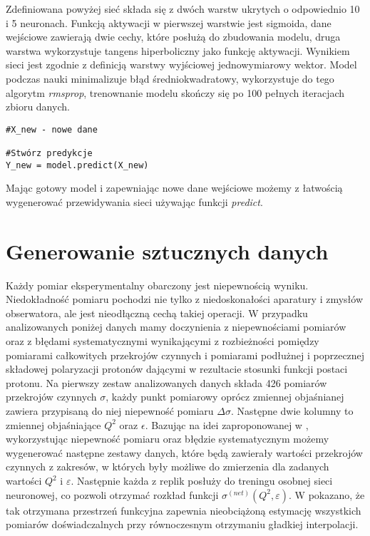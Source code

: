 \documentclass[11pt]{book}
\theoremstyle{definition}
\begin{document}
Zdefiniowana powyżej sieć składa się z dwóch warstw ukrytych o odpowiednio 10 i 5 neuronach. Funkcją aktywacji w pierwszej warstwie jest sigmoida, dane wejściowe zawierają dwie cechy, które posłużą do zbudowania modelu, druga warstwa wykorzystuje tangens hiperboliczny jako funkcję aktywacji. Wynikiem sieci jest zgodnie z definicją warstwy wyjściowej jednowymiarowy wektor. Model podczas nauki minimalizuje błąd średniokwadratowy, wykorzystuje do tego algorytm \textit{rmsprop}, trenownanie modelu skończy się po 100 pełnych iteracjach zbioru danych.

\begin{lstlisting}
#X_new - nowe dane 

#Stwórz predykcje
Y_new = model.predict(X_new)
\end{lstlisting}

Mając gotowy model i zapewniając nowe dane wejściowe możemy z łatwością wygenerować przewidywania sieci używając funkcji \textit{predict}.

\section{Generowanie sztucznych danych}


Każdy pomiar eksperymentalny obarczony jest niepewnością wyniku. Niedokładność pomiaru pochodzi nie tylko z niedoskonałości aparatury i zmysłów obserwatora, ale jest nieodłączną cechą takiej operacji. W przypadku analizowanych poniżej danych mamy doczynienia z niepewnościami pomiarów oraz z błędami systematycznymi wynikającymi z rozbieżności pomiędzy pomiarami całkowitych przekrojów czynnych i pomiarami podłużnej i poprzecznej składowej polaryzacji protonów dającymi w rezultacie stosunki funkcji postaci protonu. Na pierwszy zestaw analizowanych danych składa 426 pomiarów przekrojów czynnych $\sigma$, każdy punkt pomiarowy oprócz zmiennej objaśnianej zawiera przypisaną do niej niepewność pomiaru $\Delta \sigma$. Następne dwie kolumny to zmiennej objaśniające $Q^2$ oraz $\epsilon$. Bazując na idei zaproponowanej w \cite{2002JHEP...05..062F}, wykorzystując niepewność pomiaru oraz błędzie systematycznym możemy wygenerować następne zestawy danych, które będą zawierały wartości przekrojów czynnych z zakresów, w których były możliwe do zmierzenia dla zadanych wartości $Q^2$ i $\varepsilon$. Następnie każda z replik posłuży do treningu osobnej sieci neuronowej, co pozwoli otrzymać rozkład funkcji $\sigma^{(net)}(Q^2,\varepsilon)$. W \cite{2002JHEP...05..062F} pokazano, że tak otrzymana przestrzeń funkcyjna zapewnia nieobciążoną estymację wszystkich pomiarów doświadczalnych przy równoczesnym otrzymaniu gładkiej interpolacji. 
\end{document}
